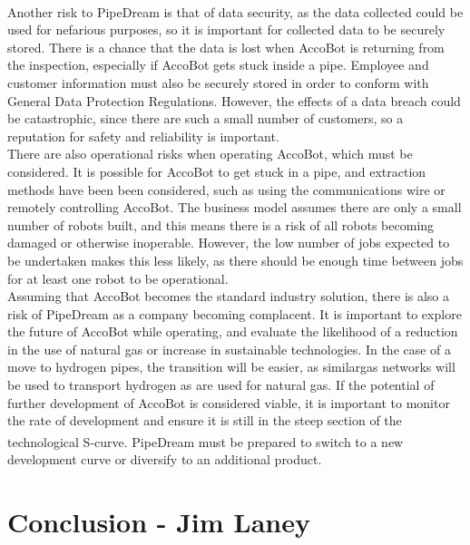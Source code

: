 \documentclass[11pt]{article}		%
\newcommand{\supercite}[1]{\textsuperscript{\cite{#1}}}		%
\begin{document}
	     \\ 
            \hspace*{2ex}Another risk to PipeDream is that of data security, as the data collected could be used for nefarious purposes, so it is important for collected data to be securely stored.
	     	There is a chance that the data is lost when AccoBot is returning from the inspection, especially if AccoBot gets stuck inside a pipe.
	     	Employee and customer information must also be securely stored in order to conform with General Data Protection Regulations.
	     	However, the effects of a data breach could be catastrophic, since there are such a small number of customers, so a reputation for safety and reliability is important.
	     	\\ 
            \hspace*{2ex}There are also operational risks when operating AccoBot, which must be considered.
	     	It is possible for AccoBot to get stuck in a pipe, and extraction methods have been been considered, such as using the communications wire or remotely controlling AccoBot.
	     	The business model assumes there are only a small number of robots built, and this means there is a risk of all robots becoming damaged or otherwise inoperable.
	     	However, the low number of jobs expected to be undertaken makes this less likely, as there should be enough time between jobs for at least one robot to be operational.
	     	\\ 
            \hspace*{2ex}Assuming that AccoBot becomes the standard industry solution, there is also a risk of PipeDream as a company becoming complacent.
	     	It is important to explore the future of AccoBot while operating, and evaluate the likelihood of a reduction in the use of natural gas or increase in sustainable technologies.
	     	In the case of a move to hydrogen pipes, the transition will be easier, as similargas networks will be used to transport hydrogen as are used for natural gas.
	     	If the potential of further development of AccoBot is considered viable, it is important to monitor the rate of development and ensure it is still in the steep section of the technological S-curve\supercite{christensen1998innovation}.
	     	PipeDream must be prepared to switch to a new development curve or diversify to an additional product.
			    
    \section[Conclusion]{Conclusion - Jim Laney}
        
\end{document}
